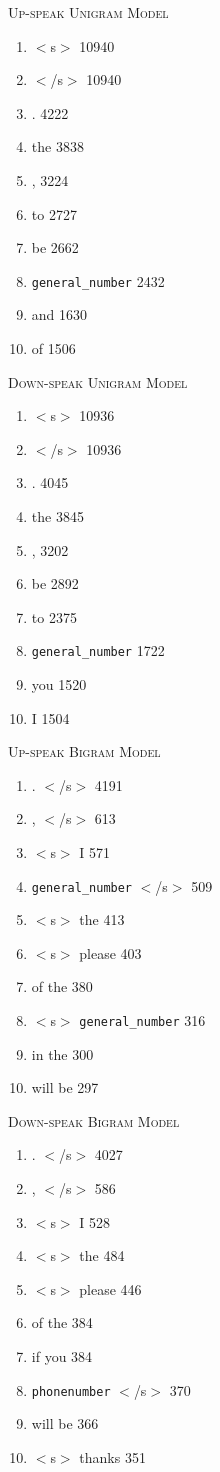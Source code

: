\documentclass{article} %
\begin{document}
\textsc{Up-speak Unigram Model}\\
\begin{enumerate}
\item $<$s$>$ 10940
\item $<$/s$>$ 10940
\item . 4222
\item the 3838
\item , 3224
\item to 2727
\item be 2662
\item \texttt{general\_number} 2432
\item and 1630
\item of 1506
\end{enumerate}

\textsc{Down-speak Unigram Model}\\
\begin{enumerate}
\item $<$s$>$ 10936
\item $<$/s$>$ 10936
\item . 4045
\item the 3845
\item , 3202
\item be 2892
\item to 2375
\item \texttt{general\_number} 1722
\item you 1520
\item I 1504
\end{enumerate}

\textsc{Up-speak Bigram Model}\\
\begin{enumerate}
\item . $<$/s$>$ 4191
\item , $<$/s$>$ 613
\item $<$s$>$  I 571
\item \texttt{general\_number} $<$/s$>$ 509
\item $<$s$>$  the 413
\item $<$s$>$  please 403
\item of the 380
\item $<$s$>$ \texttt{general\_number} 316
\item in the 300
\item will be 297
\end{enumerate}

\textsc{Down-speak Bigram Model}\\
\begin{enumerate}
\item . $<$/s$>$ 4027
\item , $<$/s$>$ 586
\item $<$s$>$ I 528
\item $<$s$>$ the 484
\item $<$s$>$ please 446
\item of the 384
\item if you 384
\item \texttt{phonenumber} $<$/s$>$ 370
\item will be 366
\item $<$s$>$  thanks 351
\end{enumerate}
\end{document}

